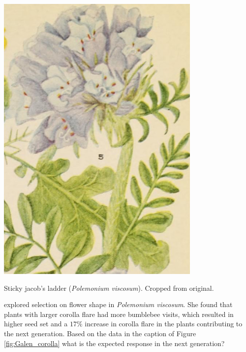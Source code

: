 \begin{marginfigure}
\begin{center}
\includegraphics[width=0.75\textwidth]{illustration_images/Quant_gen/Polemonium_viscosum_Galen/Polemonium_viscosum.jpg}
\end{center}
\caption{Sticky jacob's ladder ({\it Polemonium viscosum}). 
Cropped from original.}
\end{marginfigure}


\begin{question}{}
\citet{galen:96} explored selection on flower shape in
{\it Polemonium viscosum}.  She found that plants with larger corolla flare
had more bumblebee visits, which resulted in higher seed set and a
$17\%$ increase in corolla flare in the plants contributing to the
next generation. Based on the data in the caption of Figure \ref{fig:Galen_corolla}
what is the expected response in the next generation?
\end{question}

